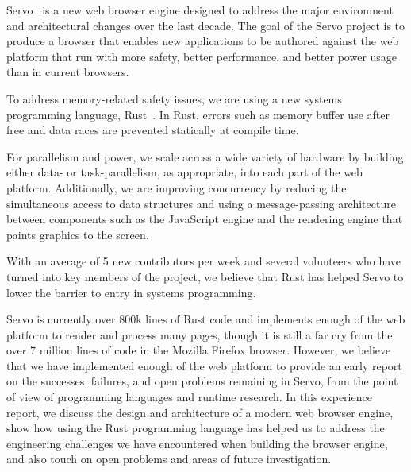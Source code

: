 Servo~\cite{SERVO} is a new web browser engine designed to address the major environment and 
architectural changes over the last decade.
The goal of the Servo project is to produce a browser that enables new applications to be authored
against the web platform that run with more safety, better performance, and better power usage
than in current browsers.

To address memory-related safety issues, we are using a new systems programming language,
Rust~\cite{RUST}.
In Rust, errors such as memory buffer use after free and data races are prevented statically at
compile time.

For parallelism and power, we scale across a wide variety of hardware by building either data-
or task-parallelism, as appropriate, into each part of the web platform.
Additionally, we are improving concurrency by reducing the simultaneous access to data
structures and using a message-passing architecture between components such as the
JavaScript engine and the rendering engine that paints graphics to the screen.

With an average of 5 new contributors per week and several volunteers who have turned
into key members of the project, we believe that Rust has helped Servo to lower the
barrier to entry in systems programming.

Servo is currently over 800k lines of Rust code and implements enough of the web platform to render and
process many pages, though it is still a far cry from the over 7 million lines of code in
the Mozilla Firefox browser.
However, we believe that we have implemented enough of the web platform to provide an
early report on the successes, failures, and open problems remaining in Servo, from the
point of view of programming languages and runtime research.
In this experience report, we discuss the design and architecture of a modern web 
browser engine, show how using the Rust programming language has helped us to  address the
engineering challenges we have encountered when building the browser engine, and also touch on
open problems and areas of future investigation.

